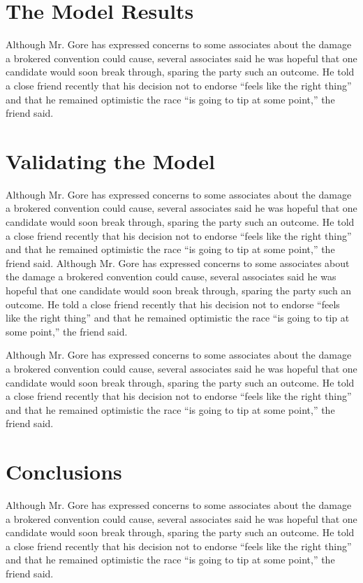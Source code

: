 \section{The Model Results}
Although Mr. Gore has expressed concerns to some associates about
the damage a brokered convention could cause, several associates
said he was hopeful that one candidate would soon break through,
sparing the party such an outcome. He told a close friend recently
that his decision not to endorse “feels like the right thing”
and that he remained optimistic the race “is going to tip at some
point,” the friend said.



\section{Validating the Model}%
Although Mr. Gore has expressed concerns to some associates about
the damage a brokered convention could cause, several associates
said he was hopeful that one candidate would soon break through,
sparing the party such an outcome. He told a close friend recently
that his decision not to endorse “feels like the right thing”
and that he remained optimistic the race “is going to tip at some
point,” the friend said. Although Mr. Gore has expressed concerns
to some associates about the damage a brokered convention could
cause, several associates said he was hopeful that one candidate
would soon break through, sparing the party such an outcome. He
told a close friend recently that his decision not to endorse
“feels like the right thing” and that he remained optimistic the
race “is going to tip at some point,” the friend said.


Although Mr. Gore has expressed concerns to some associates about
the damage a brokered convention could cause, several associates
said he was hopeful that one candidate would soon break through,
sparing the party such an outcome. He told a close friend recently
that his decision not to endorse “feels like the right thing”
and that he remained optimistic the race “is going to tip at some
point,” the friend said.

\section{Conclusions}
Although Mr. Gore has expressed concerns to some associates about
the damage a brokered convention could cause, several associates
said he was hopeful that one candidate would soon break through,
sparing the party such an outcome. He told a close friend recently
that his decision not to endorse “feels like the right thing”
and that he remained optimistic the race “is going to tip at some
point,” the friend said.
